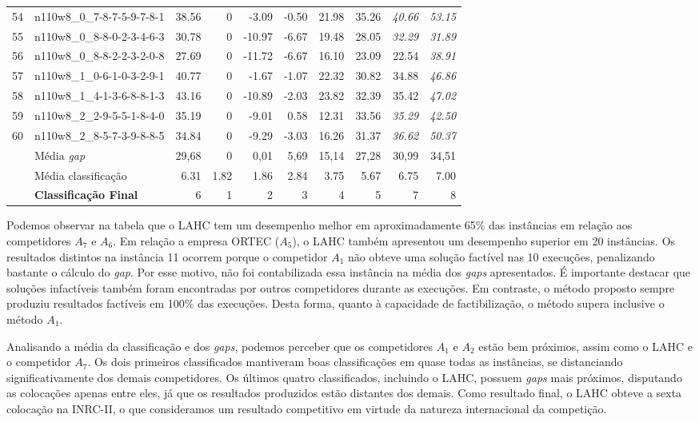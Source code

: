 \documentclass[cic,tc, twoside]{iiufrgs}
\begin{document}
\begin{table}[!]
{\begin{tabular}{rlrrrrrrrr}
   54 & n110w8\_0\_7-8-7-5-9-7-8-1 & 38.56 &   0 & -3.09 & -0.50 & 21.98 & 35.26 & \it 40.66 & \it 53.15 \\
   55 & n110w8\_0\_8-8-0-2-3-4-6-3 & 30.78 &   0 & -10.97 & -6.67 & 19.48 & 28.05 & \it 32.29 & \it 31.89 \\
   56 & n110w8\_0\_8-8-2-2-3-2-0-8 & 27.69 &   0 & -11.72 & -6.67 & 16.10 & 23.09 & 22.54 & \it 38.91 \\
   57 & n110w8\_1\_0-6-1-0-3-2-9-1 & 40.77 &   0 & -1.67 & -1.07 & 22.32 & 30.82 & 34.88 & \it 46.86 \\
   58 & n110w8\_1\_4-1-3-6-8-8-1-3 & 43.16 &   0 & -10.89 & -2.03 & 23.82 & 32.39 & 35.42 & \it 47.02 \\
   59 & n110w8\_2\_2-9-5-5-1-8-4-0 & 35.19 &   0 & -9.01 & 0.58 & 12.31 & 33.56 & \it 35.29 & \it 42.50 \\
   60 & n110w8\_2\_8-5-7-3-9-8-8-5 & 34.84 &   0 & -9.29 & -3.03 & 16.26 & 31.37 & \it 36.62 & \it 50.37 \\
 \midrule
& Média \textit{gap} & 29,68 &	0 & 0,01 & 5,69	& 15,14 & 27,28 & 30,99 & 34,51\\
 \midrule
& Média classificação & 6.31 & 1.82 & 1.86 & 2.84 & 3.75 & 5.67 & 6.75 & 7.00 \\
  \midrule
 & \textbf{Classificação Final} & 6 & 1 & 2 & 3 & 4 & 5 & 7 & 8 \\
   \bottomrule
\end{tabular}
}
\end{table}

\newpage

Podemos observar na tabela que o LAHC tem um desempenho melhor em aproximadamente 65\% das instâncias em relação aos competidores $A_7$ e $A_6$. Em relação a empresa ORTEC ($A_5$), o LAHC também apresentou um desempenho superior em 20 instâncias.
Os resultados distintos na instância 11 ocorrem porque o competidor $A_1$ não obteve uma solução factível nas 10 execuções, penalizando bastante o cálculo do \emph{gap}. Por esse motivo, não foi contabilizada essa instância na média dos \emph{gaps} apresentados. É importante destacar que soluções infactíveis também foram encontradas por outros competidores durante as execuções. Em contraste, o método proposto sempre produziu resultados factíveis em 100\% das execuções. Desta forma, quanto à capacidade de factibilização, o método supera inclusive o método $A_1$.

Analisando a média da classificação e dos \emph{gaps}, podemos perceber que os competidores $A_1$ e $A_2$ estão bem próximos, assim como o LAHC e o competidor $A_7$. 
Os dois primeiros classificados mantiveram boas classificações em quase todas as instâncias, se distanciando significativamente dos demais competidores. Os últimos quatro classificados, incluindo o LAHC, possuem \emph{gaps} mais próximos, disputando as colocações apenas entre eles, já que os resultados produzidos estão distantes dos demais. 
Como resultado final, o LAHC obteve a sexta colocação na INRC-II, o que consideramos um resultado competitivo em virtude da natureza internacional da competição. 
\end{document}
